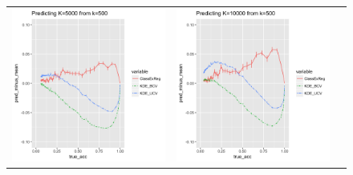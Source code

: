 \documentclass[twoside,11pt]{article}
\begin{document}
\begin{figure}[p]
\begin{tabular}{ccc}
\includegraphics[scale = 0.45, clip = true, trim = .3in 0 1.23in 0.4in]{sim_large7_biaz_K5_k0_5.png} &
\includegraphics[scale = 0.45, clip = true, trim = .3in 0 0.00in 0.4in]{sim_large7_biaz_K10_k0_5.png}\\ 

\end{tabular}
\end{figure}
\end{document}
